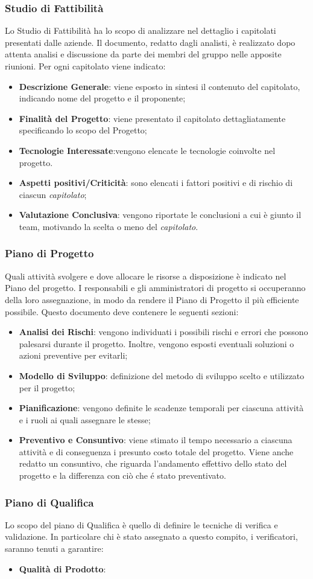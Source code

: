 \subsubsection{Studio di Fattibilità}
Lo Studio di Fattibilità ha lo scopo di analizzare nel dettaglio i capitolati presentati dalle aziende. Il documento,  redatto dagli analisti, è realizzato dopo attenta analisi e discussione da parte dei membri del gruppo nelle apposite riunioni. Per ogni capitolato viene indicato:
\begin{itemize}
  \item \textbf{Descrizione Generale}: viene esposto in sintesi il contenuto del capitolato, indicando nome del progetto e il proponente;
  \item \textbf{Finalità del Progetto}: viene presentato il capitolato dettagliatamente specificando lo scopo del Progetto;
  \item \textbf{Tecnologie Interessate}:vengono elencate le tecnologie coinvolte nel progetto.
  \item \textbf{Aspetti positivi/Criticità}: sono elencati i fattori positivi e di rischio di ciascun \textit{capitolato\glos};
  \item \textbf{Valutazione Conclusiva}: vengono riportate le conclusioni a cui è giunto il team, motivando la scelta o meno del \textit{capitolato\glos}.
\end{itemize}
\subsubsection{Piano di Progetto}
Quali attività svolgere e dove allocare le risorse a disposizione è indicato nel Piano del progetto. I responsabili e gli amministratori di progetto si occuperanno della loro assegnazione, in modo da rendere il Piano di Progetto il più efficiente possibile. Questo documento deve contenere le seguenti sezioni:
\begin{itemize}
  \item \textbf{Analisi dei Rischi}: vengono individuati i possibili rischi e errori che possono palesarsi durante il progetto. Inoltre, vengono esposti eventuali soluzioni o azioni preventive per evitarli;
  \item \textbf{Modello di Sviluppo}: definizione del metodo di sviluppo scelto e utilizzato per il progetto;
  \item \textbf{Pianificazione}: vengono definite le scadenze temporali per ciascuna attività e i ruoli ai quali assegnare le stesse;
  \item \textbf{Preventivo e Consuntivo}: viene stimato il tempo necessario a ciascuna attività e di conseguenza i presunto costo totale del progetto. Viene anche redatto un consuntivo, che riguarda l'andamento effettivo dello stato del progetto e la differenza con ciò che é stato preventivato.
\end{itemize}
\subsubsection{Piano di Qualifica}
Lo scopo del piano di Qualifica è quello di definire le tecniche di verifica e validazione. In particolare chi è stato assegnato a questo compito, i verificatori, saranno tenuti a garantire:
\begin{itemize}
  \item \textbf{Qualità di Prodotto}:
\end{itemize}
